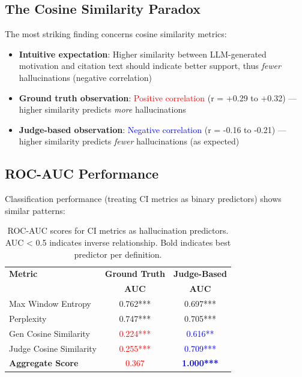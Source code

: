\subsection{The Cosine Similarity Paradox}

The most striking finding concerns cosine similarity metrics:

\begin{itemize}
    \item \textbf{Intuitive expectation}: Higher similarity between LLM-generated motivation and citation text should indicate better support, thus \textit{fewer} hallucinations (negative correlation)
    
    \item \textbf{Ground truth observation}: \textcolor{red}{Positive correlation} (r = +0.29 to +0.32) --- higher similarity predicts \textit{more} hallucinations
    
    \item \textbf{Judge-based observation}: \textcolor{blue}{Negative correlation} (r = -0.16 to -0.21) --- higher similarity predicts \textit{fewer} hallucinations (as expected)
\end{itemize}

\subsection{ROC-AUC Performance}

Classification performance (treating CI metrics as binary predictors) shows similar patterns:

\begin{table}[h]
\centering
\begin{tabular}{lcc}
\toprule
\textbf{Metric} & \textbf{Ground Truth} & \textbf{Judge-Based} \\
 & \textbf{AUC} & \textbf{AUC} \\
\midrule
Max Window Entropy & 0.762*** & 0.697*** \\
Perplexity & 0.747*** & 0.705*** \\
Gen Cosine Similarity & \textcolor{red}{0.224***} & \textcolor{blue}{0.616**} \\
Judge Cosine Similarity & \textcolor{red}{0.255***} & \textcolor{blue}{0.709***} \\
\textbf{Aggregate Score} & \textcolor{red}{0.367} & \textcolor{blue}{\textbf{1.000***}} \\
\bottomrule
\end{tabular}
\caption{ROC-AUC scores for CI metrics as hallucination predictors. AUC < 0.5 indicates inverse relationship. Bold indicates best predictor per definition.}
\label{tab:auc_comparison}
\end{table}

